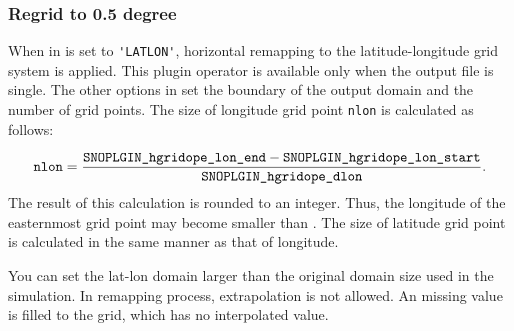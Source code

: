 \subsubsection{Regrid to 0.5 degree}


When  in  is set to \verb|'LATLON'|, horizontal remapping to the latitude-longitude grid system is applied. This plugin operator is available only when the output file is single.
The other options in  set the boundary of the output domain and the number of grid points. The size of longitude grid point \verb|nlon| is calculated as follows:

\begin{eqnarray}
  \nmitemeq{nlon} = \frac{\nmitemeq{SNOPLGIN_hgridope_lon_end} - \nmitemeq{SNOPLGIN_hgridope_lon_start} }{\nmitemeq{SNOPLGIN_hgridope_dlon}} \nonumber.
\end{eqnarray}
\noindent
The result of this calculation is rounded to an integer. Thus, the longitude of the easternmost grid point may become smaller than .
The size of latitude grid point is calculated in the same manner as that of longitude.

You can set the lat-lon domain larger than the original domain size used in the simulation. In remapping process, extrapolation is not allowed. An missing value is filled to the grid, which has no interpolated value.
